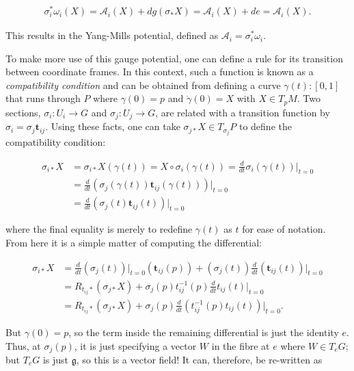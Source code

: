 \documentclass[fleqn, twocolumn, 10pt]{article}
\begin{document}
\begin{ceqn}
\begin{align*}
\sigma^\ast_i\omega_i(X) = \mathcal{A}_i(X) + dg(\sigma_\ast X) = \mathcal{A}_i(X) + de = \mathcal{A}_i(X). 
\end{align*}
\end{ceqn}
This results in the Yang-Mills potential, defined as $\mathcal{A}_i = \sigma^\ast_i\omega_i$. 

To make more use of this gauge potential, one can define a rule for its transition between coordinate frames. In this context, such a function is known as a \textit{compatibility condition} and can be obtained from defining a curve $\gamma(t): [0,1]$ that runs through $P$ where $\gamma(0) = p$ and $\dot{\gamma}(0) = X$ with $X \in T_pM$.  Two sections, $\sigma_i: U_i \to G$ and $\sigma_j: U_j \to G$, are related with a transition function by $\sigma_i = \sigma_j\mathbf{t}_{ij}$. Using these facts, one can take $\sigma_{j\ast}X \in T_{\sigma_{j}}P$ to define the compatibility condition:  

\begin{ceqn}
\begin{align*}
\sigma_{i\ast}X &= \sigma_{i\ast}X(\gamma(t)) = X \circ \sigma_i(\gamma(t)) = \frac{d}{dt}\sigma_i(\gamma(t))\biggr\rvert_{t=0}\\ &= \frac{d}{dt}(\sigma_j(\gamma(t))\mathbf{t}_{ij}(\gamma(t)))\biggr\rvert_{t=0}\\ &= \frac{d}{dt}(\sigma_j(t)\mathbf{t}_{ij}(t))\biggr\rvert_{t=0} 
\end{align*}
\end{ceqn}
where the final equality is merely to redefine $\gamma(t)$ as $t$ for ease of notation. From here it is a simple matter of computing the differential:

\begin{ceqn}
\begin{align*}
\sigma_{i\ast}X &= \frac{d}{dt}(\sigma_j(t))\biggr\rvert_{t=0}(\mathbf{t}_{ij}(p))+ (\sigma_j(t))\frac{d}{dt}(\mathbf{t}_{ij}(t))\biggr\rvert_{t=0}\\ &= R_{t_{ij}\ast}(\sigma_{j\ast}X) + \sigma_j(p)t^{-1}_{ij}(p)\frac{d}{dt}t_{ij}(t)\biggr\rvert_{t=0}\\ &= R_{t_{ij}\ast}(\sigma_{j\ast}X) + \sigma_j(p)\frac{d}{dt}(t^{-1}_{ij}(p)t_{ij}(t))\biggr\rvert_{t=0}. 
\end{align*}
\end{ceqn}
But $\gamma(0) = p$, so the term inside the remaining differential is just the identity $e$. Thus, at $\sigma_j(p)$, it is just specifying a vector $W$ in the fibre at $e$ where $W \in T_eG$; but $T_eG$ is just $\mathfrak{g}$, so this is a vector field! It can, therefore, be re-written as  
\end{document}
